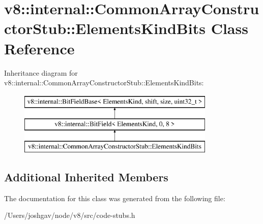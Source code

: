 \hypertarget{classv8_1_1internal_1_1_common_array_constructor_stub_1_1_elements_kind_bits}{}\section{v8\+:\+:internal\+:\+:Common\+Array\+Constructor\+Stub\+:\+:Elements\+Kind\+Bits Class Reference}
\label{classv8_1_1internal_1_1_common_array_constructor_stub_1_1_elements_kind_bits}
Inheritance diagram for v8\+:\+:internal\+:\+:Common\+Array\+Constructor\+Stub\+:\+:Elements\+Kind\+Bits\+:\begin{figure}[H]
\begin{center}
\leavevmode
\includegraphics[height=3.000000cm]{classv8_1_1internal_1_1_common_array_constructor_stub_1_1_elements_kind_bits}
\end{center}
\end{figure}
\subsection*{Additional Inherited Members}


The documentation for this class was generated from the following file\+:\begin{DoxyCompactItemize}
\item 
/\+Users/joshgav/node/v8/src/code-\/stubs.\+h\end{DoxyCompactItemize}
